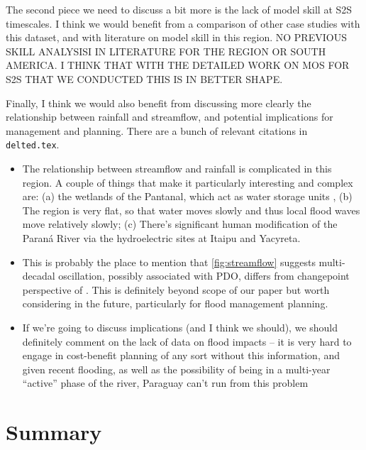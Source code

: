 \documentclass{ametsoc}
\begin{document}
The second piece we need to discuss a bit more is the lack of model skill at S2S timescales.
I think we would benefit from a comparison of other case studies with this dataset, and with literature on model skill in this region.
NO PREVIOUS SKILL ANALYSISI IN LITERATURE FOR THE REGION OR SOUTH AMERICA. I THINK THAT WITH THE DETAILED WORK ON MOS FOR S2S THAT WE CONDUCTED THIS IS IN BETTER SHAPE.

Finally, I think we would also benefit from discussing more clearly the relationship between rainfall and streamflow, and potential implications for management and planning.
There are a bunch of relevant citations in \texttt{delted.tex}.
\begin{itemize}
	\item The relationship between streamflow and rainfall is complicated in this region. A couple of things that make it particularly interesting and complex are: (a) the wetlands of the Pantanal, which act as water storage units \citep{Bravo:2011et,Barros:2004bn}, (b) The region is very flat, so that water moves slowly and thus local flood waves move relatively slowly; (c) There's significant human modification of the Paran\'a River via the hydroelectric sites at Itaipu and Yacyreta.
  \item This is probably the place to mention that \cref{fig:streamflow} suggests multi-decadal oscillation, possibly associated with PDO, differs from changepoint perspective of \citet{Collischonn:2001bi}.
	This is definitely beyond scope of our paper but worth considering in the future, particularly for flood management planning.
	\item If we're going to discuss implications (and I think we should), we should definitely comment on the lack of data on flood impacts -- it is very hard to engage in cost-benefit planning of any sort without this information, and given recent flooding, as well as the possibility of being in a multi-year ``active'' phase of the river, Paraguay can't run from this problem
\end{itemize}



\section{Summary} \label{sec:summary}
\end{document}
